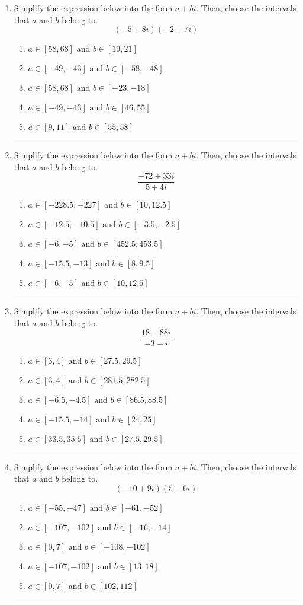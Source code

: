 \documentclass[14pt]{extbook}
\newcommand{\litem}[1]{\item#1\hspace*{-1cm}\rule{\textwidth}{0.4pt}}
\begin{document}
\begin{enumerate}
\litem{
Simplify the expression below into the form $a+bi$. Then, choose the intervals that $a$ and $b$ belong to.\[ (-5 + 8 i)(-2 + 7 i) \]\begin{enumerate}[label=\Alph*.]
\item \( a \in [58, 68] \text{ and } b \in [19, 21] \)
\item \( a \in [-49, -43] \text{ and } b \in [-58, -48] \)
\item \( a \in [58, 68] \text{ and } b \in [-23, -18] \)
\item \( a \in [-49, -43] \text{ and } b \in [46, 55] \)
\item \( a \in [9, 11] \text{ and } b \in [55, 58] \)

\end{enumerate} }
\litem{
Simplify the expression below into the form $a+bi$. Then, choose the intervals that $a$ and $b$ belong to.\[ \frac{-72 + 33 i}{5 + 4 i} \]\begin{enumerate}[label=\Alph*.]
\item \( a \in [-228.5, -227] \text{ and } b \in [10, 12.5] \)
\item \( a \in [-12.5, -10.5] \text{ and } b \in [-3.5, -2.5] \)
\item \( a \in [-6, -5] \text{ and } b \in [452.5, 453.5] \)
\item \( a \in [-15.5, -13] \text{ and } b \in [8, 9.5] \)
\item \( a \in [-6, -5] \text{ and } b \in [10, 12.5] \)

\end{enumerate} }
\litem{
Simplify the expression below into the form $a+bi$. Then, choose the intervals that $a$ and $b$ belong to.\[ \frac{18 - 88 i}{-3 - i} \]\begin{enumerate}[label=\Alph*.]
\item \( a \in [3, 4] \text{ and } b \in [27.5, 29.5] \)
\item \( a \in [3, 4] \text{ and } b \in [281.5, 282.5] \)
\item \( a \in [-6.5, -4.5] \text{ and } b \in [86.5, 88.5] \)
\item \( a \in [-15.5, -14] \text{ and } b \in [24, 25] \)
\item \( a \in [33.5, 35.5] \text{ and } b \in [27.5, 29.5] \)

\end{enumerate} }
\litem{
Simplify the expression below into the form $a+bi$. Then, choose the intervals that $a$ and $b$ belong to.\[ (-10 + 9 i)(5 - 6 i) \]\begin{enumerate}[label=\Alph*.]
\item \( a \in [-55, -47] \text{ and } b \in [-61, -52] \)
\item \( a \in [-107, -102] \text{ and } b \in [-16, -14] \)
\item \( a \in [0, 7] \text{ and } b \in [-108, -102] \)
\item \( a \in [-107, -102] \text{ and } b \in [13, 18] \)
\item \( a \in [0, 7] \text{ and } b \in [102, 112] \)

\end{enumerate} }
\end{enumerate}
\end{document}

